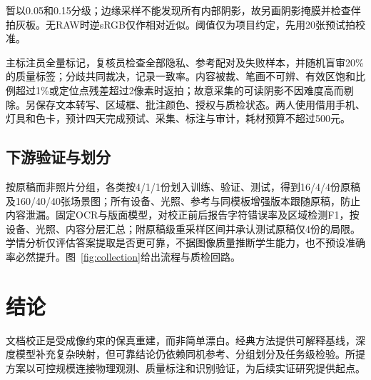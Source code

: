 \documentclass[UTF8,a4paper,zihao=5,fontset=none]{ctexart}
\begin{document}
暂以0.05和0.15分级；边缘采样不能发现所有内部阴影，故另画阴影掩膜并检查伴拍灰板。无RAW时逆sRGB仅作相对近似。阈值仅为项目约定，先用20张预试拍校准。


主标注员全量标记，复核员检查全部隐私、参考配对及失败样本，并随机盲审20\%的质量标签；分歧共同裁决，记录一致率。内容被裁、笔画不可辨、有效区饱和比例超过1\%或定位点残差超过2像素时返拍；故意采集的可读阴影不因难度高而剔除。另保存文本转写、区域框、批注颜色、授权与质检状态。两人使用借用手机、灯具和色卡，预计四天完成预试、采集、标注与审计，耗材预算不超过500元。


\subsection{下游验证与划分}

按原稿而非照片分组，各类按4/1/1份划入训练、验证、测试，得到16/4/4份原稿及160/40/40张场景图；所有设备、光照、参考与同模板增强版本跟随原稿，防止内容泄漏。固定OCR与版面模型，对校正前后报告字符错误率及区域检测F1，按设备、光照、内容分层汇总；附原稿级重采样区间并承认测试原稿仅4份的局限。学情分析仅评估答案提取是否更可靠，不据图像质量推断学生能力，也不预设准确率必然提升。图~\ref{fig:collection}给出流程与质检回路。


\section{结论}

文档校正是受成像约束的保真重建，而非简单漂白。经典方法提供可解释基线，深度模型补充复杂映射，但可靠结论仍依赖同机参考、分组划分及任务级检验。所提方案以可控规模连接物理观测、质量标注和识别验证，为后续实证研究提供起点。


\begingroup\small\linespread{1.14}\selectfont
\end{document}
